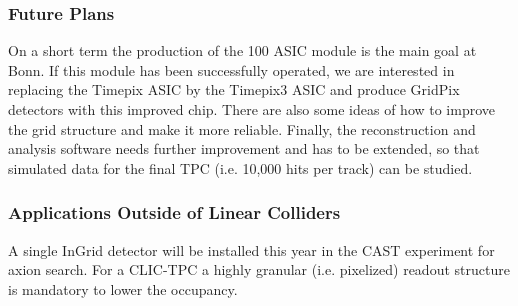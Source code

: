 \subsubsection{Future Plans}
On a short term the production of the 100 ASIC module is the main goal at Bonn. If this module has been successfully operated, we are interested in replacing the Timepix ASIC by the Timepix3 ASIC and produce GridPix detectors with this improved chip. There are also some ideas of how to improve the grid structure and make it more reliable. Finally, the reconstruction and analysis software needs further improvement and has to be extended, so that simulated data for the final TPC (i.e. 10,000 hits per track) can be studied.

\subsubsection{Applications Outside of Linear Colliders}
A single InGrid detector will be installed this year in the CAST experiment for axion search. For a CLIC-TPC a highly granular (i.e. pixelized) readout structure is mandatory to lower the occupancy.
